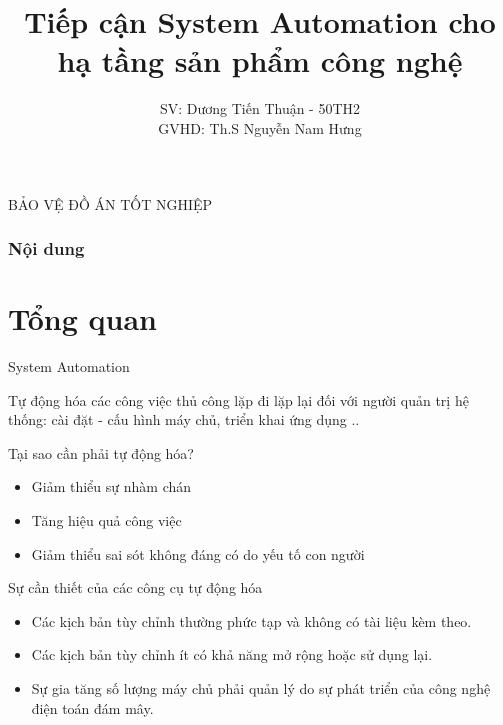 \documentclass[14pt]{beamer}
\title[Tiếp cận System Automation cho hạ tầng sản phẩm công nghệ]{Tiếp cận System Automation cho hạ tầng sản phẩm công nghệ}
\author[Dương Tiến Thuận - 50TH2]{SV: Dương Tiến Thuận - 50TH2\\GVHD: Th.S Nguyễn Nam Hưng}
\begin{document}

\begin{frame}{BẢO VỆ ĐỒ ÁN TỐT NGHIỆP}
    \titlepage
\end{frame}

\begin{frame}
  \frametitle{Nội dung}
  \tableofcontents
\end{frame}

\section{Tổng quan}
\begin{frame}{System Automation}
  \begin{alertblock}\justifying
    \Large Tự động hóa các công việc thủ công lặp đi lặp lại đối với người quản trị hệ thống: cài đặt - cấu hình máy chủ, triển khai ứng dụng ..
  \end{alertblock}
\end{frame}

\begin{frame}{Tại sao cần phải tự động hóa?}
  \begin{alertblock}\justifying
    \begin{itemize}
      \item \Large Giảm thiểu sự nhàm chán
      \item \Large Tăng hiệu quả công việc
      \item \Large Giảm thiểu sai sót không đáng có do yếu tố con người
    \end{itemize}
  \end{alertblock}
\end{frame}

\begin{frame}{Sự cần thiết của các công cụ tự động hóa}
  \begin{itemize}
    \item Các kịch bản tùy chỉnh thường phức tạp và không có tài liệu kèm theo.
    \pause
    \item Các kịch bản tùy chỉnh ít có khả năng mở rộng hoặc sử dụng lại.
    \pause
    \item Sự gia tăng số lượng máy chủ phải quản lý do sự phát triển của công nghệ điện toán đám mây.
  \end{itemize}
\end{frame}
\end{document}
